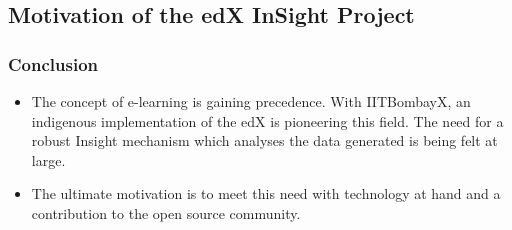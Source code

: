 \documentclass[12pt,xcolor=dvipsnames]{beamer}
\begin{document}

\subsection{Motivation of the edX InSight Project}
\begin{frame}[t]
\frametitle{Conclusion}


\begin{itemize}

\item The concept of e-learning is gaining precedence. With IITBombayX, an indigenous implementation of the edX is pioneering this field. The need for a robust Insight mechanism which analyses the data generated is being felt at large.

\item The ultimate motivation is to meet this need with technology at hand and a contribution to the open source community.

\end{itemize}

\end{frame}




\end{document}
